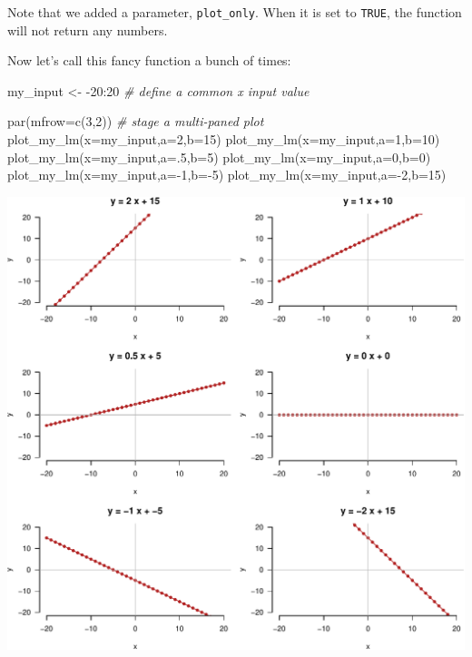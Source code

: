 \documentclass[
]{book}
\newenvironment{Shaded}{\begin{snugshade}}{\end{snugshade}}
\newcommand{\AttributeTok}[1]{\textcolor[rgb]{0.77,0.63,0.00}{#1}}
\newcommand{\CommentTok}[1]{\textcolor[rgb]{0.56,0.35,0.01}{\textit{#1}}}
\newcommand{\DecValTok}[1]{\textcolor[rgb]{0.00,0.00,0.81}{#1}}
\newcommand{\FunctionTok}[1]{\textcolor[rgb]{0.00,0.00,0.00}{#1}}
\newcommand{\NormalTok}[1]{#1}
\newcommand{\OtherTok}[1]{\textcolor[rgb]{0.56,0.35,0.01}{#1}}
\newcommand{\SpecialCharTok}[1]{\textcolor[rgb]{0.00,0.00,0.00}{#1}}
\begin{document}
Note that we added a parameter, \texttt{plot\_only}. When it is set to \texttt{TRUE}, the function will not return any numbers.

Now let's call this fancy function a bunch of times:

\begin{Shaded}
\begin{Highlighting}[]
\NormalTok{my\_input }\OtherTok{\textless{}{-}} \SpecialCharTok{{-}}\DecValTok{20}\SpecialCharTok{:}\DecValTok{20} \CommentTok{\# define a common x input value}

\FunctionTok{par}\NormalTok{(}\AttributeTok{mfrow=}\FunctionTok{c}\NormalTok{(}\DecValTok{3}\NormalTok{,}\DecValTok{2}\NormalTok{)) }\CommentTok{\# stage a multi{-}paned plot}
\FunctionTok{plot\_my\_lm}\NormalTok{(}\AttributeTok{x=}\NormalTok{my\_input,}\AttributeTok{a=}\DecValTok{2}\NormalTok{,}\AttributeTok{b=}\DecValTok{15}\NormalTok{)}
\FunctionTok{plot\_my\_lm}\NormalTok{(}\AttributeTok{x=}\NormalTok{my\_input,}\AttributeTok{a=}\DecValTok{1}\NormalTok{,}\AttributeTok{b=}\DecValTok{10}\NormalTok{)}
\FunctionTok{plot\_my\_lm}\NormalTok{(}\AttributeTok{x=}\NormalTok{my\_input,}\AttributeTok{a=}\NormalTok{.}\DecValTok{5}\NormalTok{,}\AttributeTok{b=}\DecValTok{5}\NormalTok{)}
\FunctionTok{plot\_my\_lm}\NormalTok{(}\AttributeTok{x=}\NormalTok{my\_input,}\AttributeTok{a=}\DecValTok{0}\NormalTok{,}\AttributeTok{b=}\DecValTok{0}\NormalTok{)}
\FunctionTok{plot\_my\_lm}\NormalTok{(}\AttributeTok{x=}\NormalTok{my\_input,}\AttributeTok{a=}\SpecialCharTok{{-}}\DecValTok{1}\NormalTok{,}\AttributeTok{b=}\SpecialCharTok{{-}}\DecValTok{5}\NormalTok{)}
\FunctionTok{plot\_my\_lm}\NormalTok{(}\AttributeTok{x=}\NormalTok{my\_input,}\AttributeTok{a=}\SpecialCharTok{{-}}\DecValTok{2}\NormalTok{,}\AttributeTok{b=}\DecValTok{15}\NormalTok{)}
\end{Highlighting}
\end{Shaded}

\includegraphics{figures/unnamed-chunk-292-1.pdf}
\end{document}

